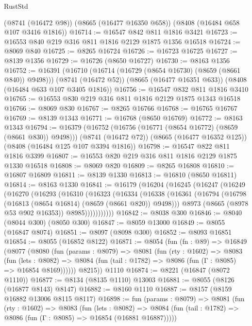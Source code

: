 \begin{lexlean}{RustStd}
\begin{coremodule}
    (@8741 (@16472 @98))
    (@8665 (@16477 @16350 @658))
    (@8408 (@16484 @658 @107 @3416 @1816))
@16714 := @16547 @842 @811 @1816 @3421
@16723 := @16553 @840 @219 @316 @811 @1816 @2129 @1875 @1356 @16518
@16724 := @8069 @840
@16725 := @8265 @16724
@16726 := @16723 @16725
@16727 := @8139 @1356
@16729 := @16726 (@8650 @16727)
@16730 := @8163 @1356
@16752 := @16391
    (@16710 (@16714 (@16729 (@8654 @16730) (@8659 (@8661 @840)) @9498)))
    (@8741 (@16472 @52))
    (@8665 (@16477 @16351 @633))
    (@8408 (@16484 @633 @107 @3405 @1816))
@16756 := @16547 @832 @811 @1816 @3410
@16765 := @16553 @830 @219 @316 @811 @1816 @2129 @1875 @1343 @16518
@16766 := @8069 @830
@16767 := @8265 @16766
@16768 := @16765 @16767
@16769 := @8139 @1343
@16771 := @16768 (@8650 @16769)
@16772 := @8163 @1343
@16794 := @16379
    (@16752 (@16756 (@16771 (@8654 @16772) (@8659 (@8661 @830)) @9498)))
    (@8741 (@16472 @72))
    (@8665 (@16477 @16352 @125))
    (@8408 (@16484 @125 @107 @3394 @1816))
@16798 := @16547 @822 @811 @1816 @3399
@16807 := @16553 @820 @219 @316 @811 @1816 @2129 @1875 @1330 @16518
@16808 := @8069 @820
@16809 := @8265 @16808
@16810 := @16807 @16809
@16811 := @8139 @1330
@16813 := @16810 (@8650 @16811)
@16814 := @8163 @1330
@16841 := @16179
    (@16204
      (@16245
        (@16247
          (@16249
            (@16270
              (@16293
                (@16310
                  (@16323
                    (@16334
                      (@16338
                        (@16361
                          (@16794 (@16798 (@16813 (@8654 @16814) (@8659 (@8661 @820)) @9498)))
                          @8973
                          (@8665 (@8978 @53 @902 @16353))
                          @8985)))))))))))
@16842 := @8038 @300
@16846 := @8040 (@8044 @300) (@8050 @300)
@16847 := @8059 @13000
@16849 := @8055 (@16847 @8074)
@16851 := @8097 (@8098 @300)
@16852 := @8093 @16851
@16854 := @8055 (@16852 @8122)
@16871 := @8054
    (fun (fn : @89) =>
    @16849
      (@8077
        (@8080
          (fun (params : @8079) =>
          @8081
            (fun (rty : @1602) =>
            @8083
              (fun (lets : @8082) =>
              @8084 (fun (tail : @1782) => @8086 (fun (Γ : @8085) => @16854 @8169))))))
        @8215))
    @1110
@16874 := @8221 (@16847 (@8072 @1110))
@16877 := @8134 (@8135 @1110) @13003
@16881 := @8055 (@8126 (@16877 @8143) @8147)
@16882 := @8160 @1110
@16887 := @8157 (@8159 @16882 @13006 @8115 @8117)
@16898 := fun (params : @8079) =>
  @8081
    (fun (rty : @1602) =>
    @8083
      (fun (lets : @8082) =>
      @8084 (fun (tail : @1782) => @8086 (fun (Γ : @8085) => @16854 (@16881 @16887)))))

\end{coremodule}
\end{lexlean}
